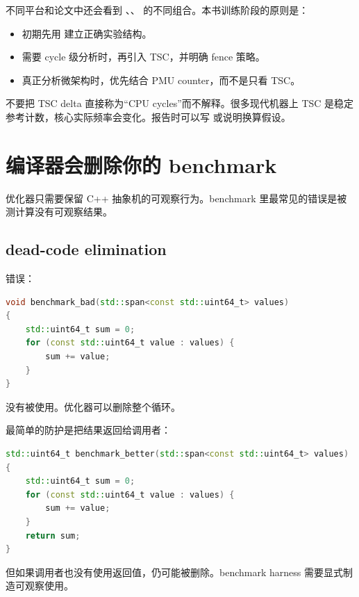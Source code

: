 不同平台和论文中还会看到 、、 的不同组合。本书训练阶段的原则是：

\begin{itemize}
  \item 初期先用  建立正确实验结构。
  \item 需要 cycle 级分析时，再引入 TSC，并明确 fence 策略。
  \item 真正分析微架构时，优先结合 PMU counter，而不是只看 TSC。
\end{itemize}

\begin{warningbox}
不要把 TSC delta 直接称为“CPU cycles”而不解释。很多现代机器上 TSC 是稳定参考计数，核心实际频率会变化。报告时可以写  或说明换算假设。
\end{warningbox}

\section{编译器会删除你的 benchmark}

优化器只需要保留 C++ 抽象机的可观察行为。benchmark 里最常见的错误是被测计算没有可观察结果。

\subsection{dead-code elimination}

错误：

\begin{lstlisting}[language=C++]
void benchmark_bad(std::span<const std::uint64_t> values)
{
    std::uint64_t sum = 0;
    for (const std::uint64_t value : values) {
        sum += value;
    }
}
\end{lstlisting}

 没有被使用。优化器可以删除整个循环。

最简单的防护是把结果返回给调用者：

\begin{lstlisting}[language=C++]
std::uint64_t benchmark_better(std::span<const std::uint64_t> values)
{
    std::uint64_t sum = 0;
    for (const std::uint64_t value : values) {
        sum += value;
    }
    return sum;
}
\end{lstlisting}

但如果调用者也没有使用返回值，仍可能被删除。benchmark harness 需要显式制造可观察使用。

\subsection{}

